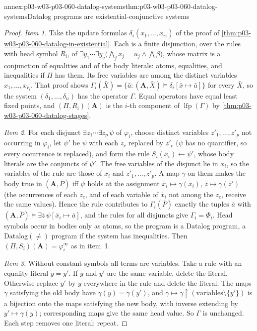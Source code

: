 \begin{annexitem}{annex:p03-w03-p03-060-datalog-systems}{thm:p03-w03-p03-060-datalog-systems}{Datalog programs are existential-conjunctive systems}
\begin{proof}
\emph{Item 1.} Take the update formulas \(\delta_i(x_1,\ldots,x_{r_i})\)
of the proof of \cref{thm:p03-w03-p03-060-datalog-in-existential}. Each is
a finite disjunction, over the rules with head symbol \(R_i\), of
\(\exists y_1\cdots\exists y_q\bigl(\bigwedge_jx_j=u_j\wedge\bigwedge\beta\bigr)\),
whose matrix is a conjunction of equalities and of the body literals:
atoms, equalities, and inequalities if \(\Pi\) has them. Its free variables
are among the distinct variables \(x_1,\ldots,x_{r_i}\). That proof shows
\(\Gamma_i(\bar X)=\{\bar a:(\mathbf A,\bar X)\models\delta_i[\bar x\mapsto\bar a]\}\)
for every \(\bar X\), so the system \((\delta_1,\ldots,\delta_n)\) has the
operator \(\Gamma\). Equal operators have equal least fixed points, and
\((\Pi,R_i)(\mathbf A)\) is the \(i\)-th component of
\(\operatorname{lfp}(\Gamma)\) by \cref{thm:p03-w03-p03-060-datalog-stages}.

\emph{Item 2.} For each disjunct \(\exists z_1\cdots\exists z_p\,\psi\) of
\(\varphi_i\), choose distinct variables \(z'_1,\ldots,z'_p\) not occurring
in \(\varphi_i\), let \(\psi'\) be \(\psi\) with each \(z_c\) replaced by
\(z'_c\) (\(\psi\) has no quantifier, so every occurrence is replaced), and
form the rule \(S_i(\bar x_i)\leftarrow\psi'\), whose body literals are the
conjuncts of \(\psi'\). The free variables of the disjunct lie in
\(\bar x_i\), so the variables of the rule are those of \(\bar x_i\) and
\(z'_1,\ldots,z'_p\). A map \(\gamma\) on them makes the body true in
\((\mathbf A,\bar P)\) iff \(\psi\) holds at the assignment
\(\bar x_i\mapsto\gamma(\bar x_i)\), \(\bar z\mapsto\gamma(\bar z')\)
(the occurrences of each \(z_c\), and of each variable of \(\bar x_i\) not
among the \(z_c\), receive the same values). Hence the rule contributes to
\(\Gamma_i(\bar P)\) exactly the tuples \(\bar a\) with
\((\mathbf A,\bar P)\models\exists\bar z\,\psi[\bar x_i\mapsto\bar a]\), and
the rules for all disjuncts give \(\Gamma_i=\Phi_i\). Head symbols occur in
bodies only as atoms, so the program is a Datalog program, a
Datalog\((\neq)\) program if the system has inequalities. Then
\((\Pi,S_i)(\mathbf A)=\varphi^\infty_i\) as in item~1.

\emph{Item 3.} Without constant symbols all terms are variables. Take a
rule with an equality literal \(y=y'\). If \(y\) and \(y'\) are the same
variable, delete the literal. Otherwise replace \(y'\) by \(y\) everywhere
in the rule and delete the literal. The maps \(\gamma\) satisfying the old
body have \(\gamma(y)=\gamma(y')\), and \(\gamma\mapsto\gamma\restriction(\text{variables}\setminus\{y'\})\)
is a bijection onto the maps satisfying the new body, with inverse
extending by \(y'\mapsto\gamma(y)\); corresponding maps give the same head
value. So \(\Gamma\) is unchanged. Each step removes one literal; repeat.


\end{proof}
\end{annexitem}
